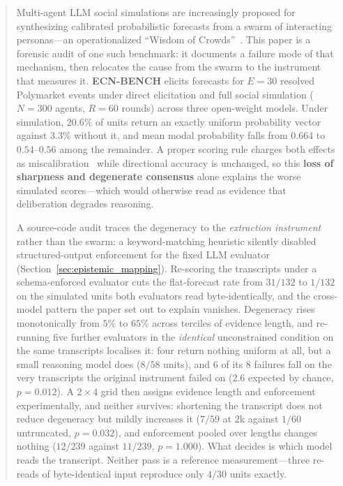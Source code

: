 \documentclass[11pt,journal,onecolumn]{IEEEtran}
\begin{document}
\begin{abstract}
Multi-agent LLM social simulations are increasingly proposed for synthesizing calibrated probabilistic forecasts from a swarm of interacting personas---an operationalized ``Wisdom of Crowds''~\cite{surowiecki2005}. This paper is a forensic audit of one such benchmark: it documents a failure mode of that mechanism, then relocates the cause from the swarm to the instrument that measures it. \textbf{ECN-BENCH} elicits forecasts for $E=30$ resolved Polymarket events under direct elicitation and full social simulation ($N=300$ agents, $R=60$ rounds) across three open-weight models. Under simulation, $20.6\%$ of units return an exactly uniform probability vector against $3.3\%$ without it, and mean modal probability falls from $0.664$ to $0.54$--$0.56$ among the remainder. A proper scoring rule charges both effects as miscalibration~\cite{gneiting2007} while directional accuracy is unchanged, so this \textbf{loss of sharpness and degenerate consensus} alone explains the worse simulated scores---which would otherwise read as evidence that deliberation degrades reasoning.

A source-code audit traces the degeneracy to the \emph{extraction instrument} rather than the swarm: a keyword-matching heuristic silently disabled structured-output enforcement for the fixed LLM evaluator (Section~\ref{sec:epistemic_mapping}). Re-scoring the transcripts under a schema-enforced evaluator cuts the flat-forecast rate from $31/132$ to $1/132$ on the simulated units both evaluators read byte-identically, and the cross-model pattern the paper set out to explain vanishes. Degeneracy rises monotonically from $5\%$ to $65\%$ across terciles of evidence length, and re-running five further evaluators in the \emph{identical} unconstrained condition on the same transcripts localises it: four return nothing uniform at all, but a small reasoning model does ($8/58$ units), and $6$ of its $8$ failures fall on the very transcripts the original instrument failed on ($2.6$ expected by chance, $p = 0.012$). A $2 \times 4$ grid then assigns evidence length and enforcement experimentally, and neither survives: shortening the transcript does not reduce degeneracy but mildly increases it ($7/59$ at $2$k against $1/60$ untruncated, $p = 0.032$), and enforcement pooled over lengths changes nothing ($12/239$ against $11/239$, $p = 1.000$). What decides is which model reads the transcript. Neither pass is a reference measurement---three re-reads of byte-identical input reproduce only $4/30$ units exactly.


\end{abstract}
\end{document}
